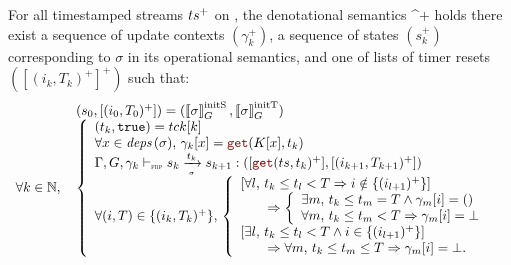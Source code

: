 \begin{lemma}
    For all timestamped streams $ts^+$ on \tck, the denotational semantics 
    {\sigma}{\ts^+} holds \iff there exist a sequence of update contexts $(\gamma_k^+)$, a sequence
    of states $(s_k^+)$ corresponding to $\sigma$ in its operational semantics, and one of lists of
    timer resets $([(i_k, T_k)^+]^+)$ such that:
    \begin{equation*}
        \begin{array}{ll}
                                 & (s_0, [(i_0, T_0)^+]) = (\initstate{\sigma}, \inittimer{\sigma}) \\
            \forall k \in \N, \, &
            \left\{
            \begin{array}{l}
                (t_k, \true) = \tck[k]                                                                     \\
                \forall x \in \depSet{\sigma}, \, \gamma_k[x] = \getAt{K[x]}{t_k}                          \\
                \sigmaOpSem{\gamma_k}{s_k}{\sigma}{t_k}{s_{k+1}}{\getAt{\ts}{t_k}^+}{(i_{k+1}, T_{k+1})^+} \\
                \forall (i, T) \in \{(i_k, T_k)^+\}, \,
                \left\{
                \begin{array}{l}
                    \left[\forall l, \, t_k \le t_l < T \Rightarrow i \notin \{(i_{l+1})^+\} \right]   \\
                    \qquad \Rightarrow
                    \left\{\begin{array}{l}
                               \exists m, \, t_k \le t_m = T \wedge \gamma_m[i] = () \\
                               \forall m, \, t_k \le t_m < T \Rightarrow \gamma_m[i] = \bot
                           \end{array}\right.                 \\
                    \left[\exists l, \, t_k \le t_l < T \wedge i \in \{(i_{l+1})^+\} \right]           \\
                    \qquad \Rightarrow \forall m, \, t_k \le t_m \le T \Rightarrow \gamma_m[i] = \bot. \\
                \end{array}
                \right.
            \end{array}
            \right.
        \end{array}
    \end{equation*}
\end{lemma}
